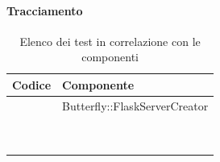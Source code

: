     \setcounter{tu}{0}

	\paragraph{Tracciamento} \label{tracciamentounita}



	\begin{table}[H]
		\centering
		{\def\arraystretch{1.4}
		\begin{tabularx}{\textwidth}{YY}
			\textbf{Codice} & \textbf{Componente} \\
			\toprule
			\addtotu & Butterfly::FlaskServerCreator \\
			\addtoti &  \\
			\addtoti & \\
			\addtoti & \\
			\addtoti &  \\
			\addtoti & \\
			\addtoti &  \\
			\addtoti & \\
			\addtoti & \\
			\bottomrule\\
		\end{tabularx}}
		\caption{Elenco dei test in correlazione con le componenti}
	\end{table}
